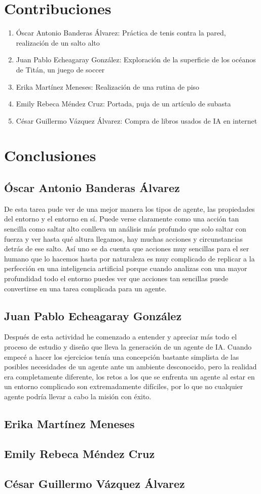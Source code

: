 \documentclass{article}
\begin{document}
    \section{Contribuciones}
        \begin{enumerate}
            \item Óscar Antonio Banderas Álvarez: Práctica de tenis contra la pared, realización de un salto alto
            \item Juan Pablo Echeagaray González: Exploración de la superficie de los océanos de Titán, un juego de soccer
            \item Erika Martínez Meneses: Realización de una rutina de piso
            \item Emily Rebeca Méndez Cruz: Portada, puja de un artículo de subasta
            \item César Guillermo Vázquez Álvarez: Compra de libros usados de IA en internet
        \end{enumerate}

    \section{Conclusiones}
        \subsection{Óscar Antonio Banderas Álvarez}
            De esta tarea pude ver de una mejor manera los tipos de agente, las propiedades del entorno y el entorno en sí. Puede verse claramente como una acción tan sencilla como saltar alto conlleva un análisis más profundo que solo saltar con fuerza y ver hasta qué altura llegamos, hay muchas acciones y circunstancias detrás de ese salto. Así uno se da cuenta que acciones muy sencillas para el ser humano que lo hacemos hasta por naturaleza es muy complicado de replicar a la perfección en una inteligencia artificial porque cuando analizas con una mayor profundidad todo el entorno puedes ver que acciones tan sencillas puede convertirse en una tarea complicada para un agente.

        \subsection{Juan Pablo Echeagaray González}
            Después de esta actividad he comenzado a entender y apreciar más todo el proceso de estudio y diseño que lleva la generación de un agente de IA. Cuando empecé a hacer los ejercicios tenía una concepción bastante simplista de las posibles necesidades de un agente ante un ambiente desconocido, pero la realidad era completamente diferente, los retos a los que se enfrenta un agente al estar en un entorno complicado son extremadamente difíciles, por lo que no cualquier agente podría llevar a cabo la misión con éxito.


        \subsection{Erika Martínez Meneses}

        \subsection{Emily Rebeca Méndez Cruz}

        \subsection{César Guillermo Vázquez Álvarez}
\end{document}

